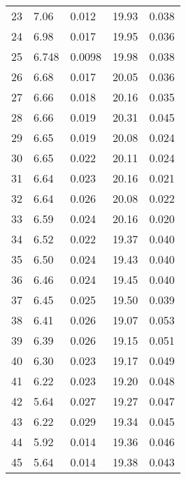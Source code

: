 \begin{table}
\begin{tabular}{c|ll|ll}
23 & 7.06 & 0.012 & 19.93 & 0.038 \\
24 & 6.98 & 0.017 & 19.95 & 0.036 \\
25 & 6.748 & 0.0098 & 19.98 & 0.038 \\
26 & 6.68 & 0.017 & 20.05 & 0.036 \\
27 & 6.66 & 0.018 & 20.16 & 0.035 \\
28 & 6.66 & 0.019 & 20.31 & 0.045 \\
29 & 6.65 & 0.019 & 20.08 & 0.024 \\
30 & 6.65 & 0.022 & 20.11 & 0.024 \\
31 & 6.64 & 0.023 & 20.16 & 0.021 \\
32 & 6.64 & 0.026 & 20.08 & 0.022 \\
33 & 6.59 & 0.024 & 20.16 & 0.020 \\
34 & 6.52 & 0.022 & 19.37 & 0.040 \\
35 & 6.50 & 0.024 & 19.43 & 0.040 \\
36 & 6.46 & 0.024 & 19.45 & 0.040 \\
37 & 6.45 & 0.025 & 19.50 & 0.039 \\
38 & 6.41 & 0.026 & 19.07 & 0.053 \\
39 & 6.39 & 0.026 & 19.15 & 0.051 \\
40 & 6.30 & 0.023 & 19.17 & 0.049 \\
41 & 6.22 & 0.023 & 19.20 & 0.048 \\
42 & 5.64 & 0.027 & 19.27 & 0.047 \\
43 & 6.22 & 0.029 & 19.34 & 0.045 \\
44 & 5.92 & 0.014 & 19.36 & 0.046 \\
45 & 5.64 & 0.014 & 19.38 & 0.043 \\
               \hline
        \end{tabular}
    \end{table}
    \clearpage

